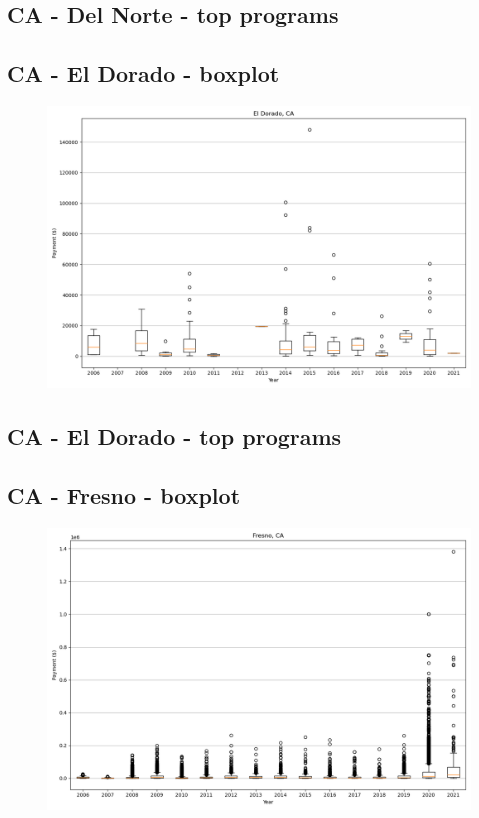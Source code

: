 \subsection*{CA - Del Norte - top programs}

\newpage
\subsection*{CA - El Dorado - boxplot}
\begin{figure}[h]
\centering
\includegraphics[width=7in]{../output/boxplots/counties/El Dorado-CA_boxplot.png}
\end{figure}


\subsection*{CA - El Dorado - top programs}

\newpage
\subsection*{CA - Fresno - boxplot}
\begin{figure}[h]
\centering
\includegraphics[width=7in]{../output/boxplots/counties/Fresno-CA_boxplot.png}
\end{figure}


